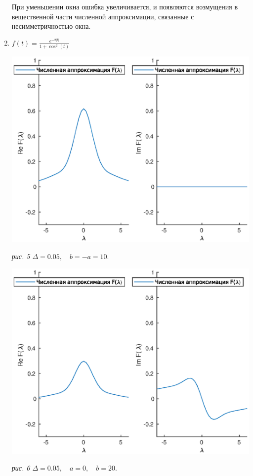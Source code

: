 \documentclass[11pt]{article}
\begin{document}
\begin{enumerate}
При уменьшении окна ошибка увеличивается, и появляются возмущения в вещественной части численной 
аппроксимации, связанные с несимметричностью окна.

\newpage
\item $f\left(t\right) = \frac{e^{-2\lvert t\rvert}}{1 + \cos^2\left(t\right)}$

\includegraphics[width=1.0\textwidth]{gr3_1.eps}
\begin{center}
\it{рис. 5 \quad $\Delta = 0.05, \quad b = -a = 10.$}
\end{center}


\includegraphics[width=1.0\textwidth]{gr3_2.eps}
\begin{center}
\it{рис. 6 \quad $\Delta = 0.05, \quad a = 0, \quad b = 20.$}
\end{center}


\end{enumerate}
\end{document}
